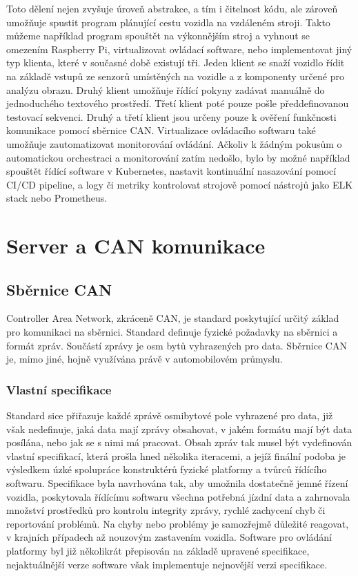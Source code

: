 \documentclass[czech,bachelor,dept460,male,cpp,cpdeclaration]{diploma}
\begin{document}
Toto dělení nejen zvyšuje úroveň abstrakce, a tím i čitelnost kódu, ale zároveň umožňuje spustit program plánující 
cestu vozidla na vzdáleném stroji. Takto můžeme například program spouštět na výkonnějším stroj a vyhnout se omezením 
Raspberry Pi, virtualizovat ovládací software, nebo implementovat jiný typ klienta, které v současné době existují tři.
Jeden klient se snaží vozidlo řídit na základě vstupů ze senzorů umístěných na vozidle a z komponenty určené pro analýzu obrazu. 
Druhý klient umožňuje řídící pokyny zadávat manuálně do jednoduchého textového prostředí. Třetí klient poté pouze pošle 
předdefinovanou testovací sekvenci. Druhý a třetí klient jsou určeny pouze k ověření funkčnosti komunikace pomocí sběrnice CAN. 
Virtualizace ovládacího softwaru také umožňuje zautomatizovat monitorování ovládání. Ačkoliv k žádným pokusům o automatickou 
orchestraci a monitorování zatím nedošlo, bylo by možné například spouštět řídící software v Kubernetes, nastavit kontinuální 
nasazování pomocí CI/CD pipeline, a logy či metriky kontrolovat strojově pomocí nástrojů jako ELK stack nebo Prometheus.

\section{Server a CAN komunikace}

\subsection{Sběrnice CAN}

Controller Area Network, zkráceně CAN, je standard poskytující určitý základ pro komunikaci na sběrnici. Standard definuje
fyzické požadavky na sběrnici a formát zpráv. Součástí zprávy je osm bytů vyhrazených pro data. Sběrnice CAN je, mimo jiné, hojně
využívána právě v automobilovém průmyslu.

\subsubsection{Vlastní specifikace}
Standard sice přiřazuje každé zprávě osmibytové pole vyhrazené pro data, již však nedefinuje, jaká data mají zprávy obsahovat, 
v jakém formátu mají být data posílána, nebo jak se s nimi má pracovat. Obsah zpráv tak musel být vydefinován vlastní specifikací, 
která prošla hned několika iteracemi, a jejíž finální podoba je výsledkem úzké spolupráce konstruktérů fyzické platformy a tvůrců 
řídícího softwaru. Specifikace byla navrhována tak, aby umožnila dostatečně jemné řízení vozidla, poskytovala řídícímu softwaru
všechna potřebná jízdní data a zahrnovala množství prostředků pro kontrolu integrity zprávy, rychlé zachycení chyb či reportování
problémů. Na chyby nebo problémy je samozřejmě důležité reagovat, v krajních případech až nouzovým zastavením vozidla. Software
pro ovládání platformy byl již několikrát přepisován na základě upravené specifikace, nejaktuálnější verze software však 
implementuje nejnovější verzi specifikace.
\end{document}
